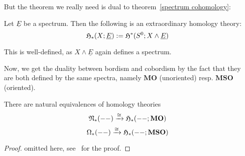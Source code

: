 \documentclass[a4paper,11pt]{article}
\begin{document}
But the theorem we really need is dual to theorem\ \ref{spectrum cohomology}:
\begin{theodef}
    Let \(\underline{E}\) be a spectrum. Then the following is an extraordinary homology theory:
    \[\mathfrak{H}_\ast(X;\underline{E}):=\mathfrak{H}^\ast(S^0;X\land \underline{E})\]
\end{theodef}

\begin{remark}
    This is well-defined, as \(X\land\underline{E}\) again defines a spectrum.
\end{remark}

Now, we get the duality between bordism and cobordism by the fact that they are both defined by the same spectra, namely \(\mathbf{MO}\) (unoriented) resp. \(\mathbf{MSO}\) (oriented).

\begin{theorem}
    There are natural equivalences of homology theories
    \[\mathfrak{N}_\ast(--)\xrightarrow{\cong}\mathfrak{H}_\ast(--;\mathbf{MO})\]
    \[\Omega_\ast(--)\xrightarrow{\cong}\mathfrak{H}_\ast(--;\mathbf{MSO})\]
\end{theorem}

\begin{proof}
    omitted here, see\ \cite{thom} for the proof.
\end{proof}





\newpage
{}
\printbibliography%
\end{document}

